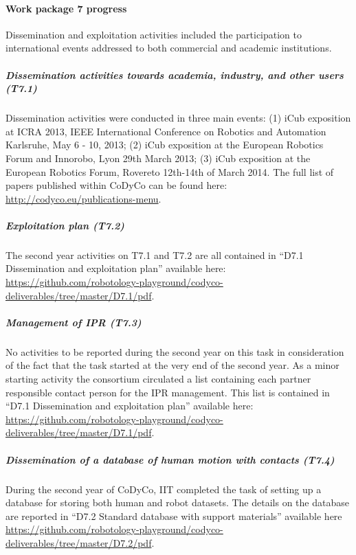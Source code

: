 

\paragraph{Work package 7 progress}

Dissemination and exploitation activities included the participation to international events addressed to both commercial and academic institutions. 

\subparagraph{Dissemination activities towards academia, industry, and other users (T7.1)}

Dissemination activities were conducted in three main events: (1) iCub exposition at ICRA 2013, IEEE International Conference on Robotics and Automation Karlsruhe, May 6 - 10, 2013; (2) iCub exposition at the European Robotics Forum and Innorobo, Lyon 29th March 2013; (3) iCub exposition at the European Robotics Forum, Rovereto 12th-14th of March 2014. The full list of papers published within CoDyCo can be found here: \url{http://codyco.eu/publications-menu}.

\subparagraph{Exploitation plan (T7.2)}

The second year activities on T7.1 and T7.2 are all contained in ``D7.1 Dissemination and exploitation plan'' available here: \url{https://github.com/robotology-playground/codyco-deliverables/tree/master/D7.1/pdf}.

\subparagraph{Management of IPR (T7.3)}

No activities to be reported during the second year on this task in consideration of the fact that the task started at the very end of the second year. As a minor starting activity the consortium circulated a list containing each partner responsible contact person for the IPR management. This list is contained in ``D7.1 Dissemination and exploitation plan'' available here: \url{https://github.com/robotology-playground/codyco-deliverables/tree/master/D7.1/pdf}.

\subparagraph{Dissemination of a database of human motion with contacts (T7.4)}

During the second year of CoDyCo, IIT completed the task of setting up a database for storing both human and robot datasets. The details on the database are reported in ``D7.2 Standard database with support materials'' available here \url{https://github.com/robotology-playground/codyco-deliverables/tree/master/D7.2/pdf}. 

